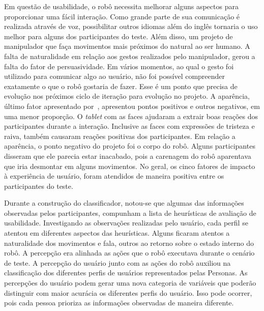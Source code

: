 Em questão de usabilidade, o robô necessita melhorar alguns aspectos para proporcionar uma fácil interação. Como grande parte de sua comunicação é realizada através de voz, possibilitar outros idiomas além do inglês tornaria o uso melhor para alguns dos participantes do teste. Além disso, um projeto de manipulador que faça movimentos mais próximos do natural ao ser humano. A falta de naturalidade em relação aos gestos realizados pelo manipulador, gerou a falta do fator de persuasividade. Em vários momentos, ao qual o gesto foi utilizado para comunicar algo ao usuário, não foi possível compreender exatamente o que o robô gostaria de fazer. Esse é um ponto que precisa de evolução nos próximos ciclo de iteração para evolução no projeto. A aparência, último fator apresentado por~\textcite{hartson:2012}, apresentou pontos positivos e outros negativos, em uma menor proporção. O \emph{tablet} com as faces ajudaram a extrair boas reações dos participantes durante a interação. Inclusive as faces com expressões de tristeza e raiva, também causaram reações positivas dos participantes. Em relação a aparência, o ponto negativo do projeto foi o corpo do robô. Alguns participantes disseram que ele parecia estar inacabado, pois a carenagem do robô aparentava que iria desmontar em alguns movimentos. No geral, os cinco fatores de impacto à experiência de usuário, foram atendidos de maneira positiva entre os participantes do teste.

Durante a construção do classificador, notou-se que algumas das informações observadas pelos participantes, compunham a lista de heurísticas de avaliação de usabilidade. Investigando as observações realizadas pelo usuário, cada perfil se atentou em diferentes aspectos das heurísticas. Alguns ficaram atentos a naturalidade dos movimentos e fala, outros ao retorno sobre o estado interno do robô. A percepção era alinhada as ações que o robô executava durante o cenário de teste. A percepção do usuário junto com as ações do robô auxiliou na classificação dos diferentes perfis de usuários representados pelas Personas. As percepções do usuário podem gerar uma nova categoria de variáveis que poderão distinguir com maior acurácia os diferentes perfis do usuário. Isso pode ocorrer, pois cada pessoa prioriza as informações observadas de maneira diferente. 

